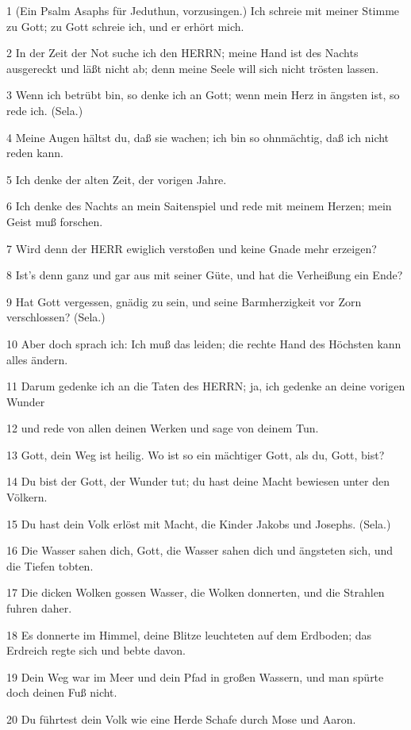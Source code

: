 \par 1 (Ein Psalm Asaphs für Jeduthun, vorzusingen.) Ich schreie mit meiner Stimme zu Gott; zu Gott schreie ich, und er erhört mich.
\par 2 In der Zeit der Not suche ich den HERRN; meine Hand ist des Nachts ausgereckt und läßt nicht ab; denn meine Seele will sich nicht trösten lassen.
\par 3 Wenn ich betrübt bin, so denke ich an Gott; wenn mein Herz in ängsten ist, so rede ich. (Sela.)
\par 4 Meine Augen hältst du, daß sie wachen; ich bin so ohnmächtig, daß ich nicht reden kann.
\par 5 Ich denke der alten Zeit, der vorigen Jahre.
\par 6 Ich denke des Nachts an mein Saitenspiel und rede mit meinem Herzen; mein Geist muß forschen.
\par 7 Wird denn der HERR ewiglich verstoßen und keine Gnade mehr erzeigen?
\par 8 Ist's denn ganz und gar aus mit seiner Güte, und hat die Verheißung ein Ende?
\par 9 Hat Gott vergessen, gnädig zu sein, und seine Barmherzigkeit vor Zorn verschlossen? (Sela.)
\par 10 Aber doch sprach ich: Ich muß das leiden; die rechte Hand des Höchsten kann alles ändern.
\par 11 Darum gedenke ich an die Taten des HERRN; ja, ich gedenke an deine vorigen Wunder
\par 12 und rede von allen deinen Werken und sage von deinem Tun.
\par 13 Gott, dein Weg ist heilig. Wo ist so ein mächtiger Gott, als du, Gott, bist?
\par 14 Du bist der Gott, der Wunder tut; du hast deine Macht bewiesen unter den Völkern.
\par 15 Du hast dein Volk erlöst mit Macht, die Kinder Jakobs und Josephs. (Sela.)
\par 16 Die Wasser sahen dich, Gott, die Wasser sahen dich und ängsteten sich, und die Tiefen tobten.
\par 17 Die dicken Wolken gossen Wasser, die Wolken donnerten, und die Strahlen fuhren daher.
\par 18 Es donnerte im Himmel, deine Blitze leuchteten auf dem Erdboden; das Erdreich regte sich und bebte davon.
\par 19 Dein Weg war im Meer und dein Pfad in großen Wassern, und man spürte doch deinen Fuß nicht.
\par 20 Du führtest dein Volk wie eine Herde Schafe durch Mose und Aaron.

